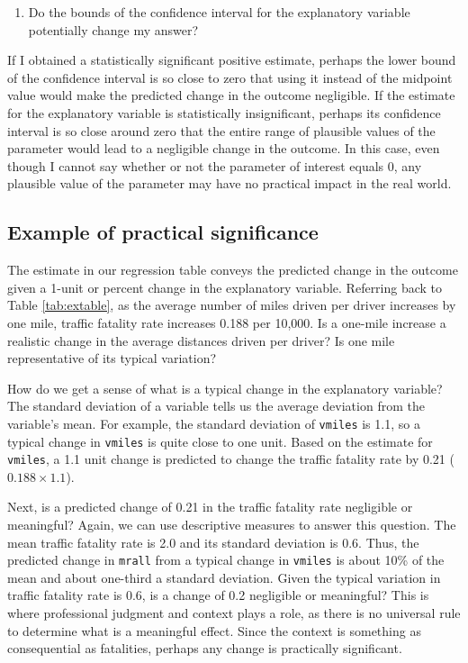 \documentclass[
]{book}
\providecommand{\tightlist}{%
  \setlength{\itemsep}{0pt}\setlength{\parskip}{0pt}}
\begin{document}
\begin{enumerate}
\def\labelenumi{\arabic{enumi}.}
\setcounter{enumi}{2}
\tightlist
\item
  Do the bounds of the confidence interval for the explanatory variable potentially change my answer?
\end{enumerate}

If I obtained a statistically significant positive estimate, perhaps the lower bound of the confidence interval is so close to zero that using it instead of the midpoint value would make the predicted change in the outcome negligible. If the estimate for the explanatory variable is statistically insignificant, perhaps its confidence interval is so close around zero that the entire range of plausible values of the parameter would lead to a negligible change in the outcome. In this case, even though I cannot say whether or not the parameter of interest equals 0, any plausible value of the parameter may have no practical impact in the real world.

\hypertarget{example-of-practical-significance}{%
\subsection{Example of practical significance}\label{example-of-practical-significance}}

The estimate in our regression table conveys the predicted change in the outcome given a 1-unit or percent change in the explanatory variable. Referring back to Table \ref{tab:extable}, as the average number of miles driven per driver increases by one mile, traffic fatality rate increases 0.188 per 10,000. Is a one-mile increase a realistic change in the average distances driven per driver? Is one mile representative of its typical variation?

How do we get a sense of what is a typical change in the explanatory variable? The standard deviation of a variable tells us the average deviation from the variable's mean. For example, the standard deviation of \texttt{vmiles} is 1.1, so a typical change in \texttt{vmiles} is quite close to one unit. Based on the estimate for \texttt{vmiles}, a 1.1 unit change is predicted to change the traffic fatality rate by 0.21 (\(0.188 \times 1.1\)).

Next, is a predicted change of 0.21 in the traffic fatality rate negligible or meaningful? Again, we can use descriptive measures to answer this question. The mean traffic fatality rate is 2.0 and its standard deviation is 0.6. Thus, the predicted change in \texttt{mrall} from a typical change in \texttt{vmiles} is about 10\% of the mean and about one-third a standard deviation. Given the typical variation in traffic fatality rate is 0.6, is a change of 0.2 negligible or meaningful? This is where professional judgment and context plays a role, as there is no universal rule to determine what is a meaningful effect. Since the context is something as consequential as fatalities, perhaps any change is practically significant.
\end{document}
